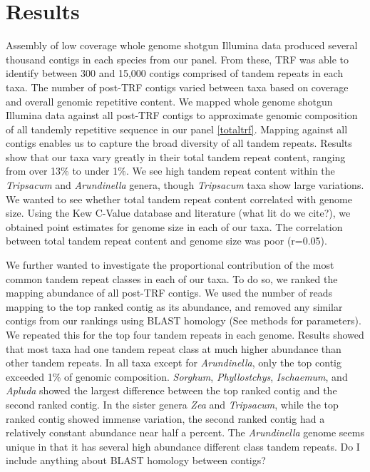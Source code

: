 \documentclass[10pt,letterpaper]{article}
\begin{document}
\section*{Results}
Assembly of low coverage whole genome shotgun Illumina data produced several thousand contigs in each species from our panel.
From these, TRF was able to identify between 300 and 15,000 contigs comprised of tandem repeats in each taxa.
The number of post-TRF contigs varied between taxa based on coverage and overall genomic repetitive content.
We mapped whole genome shotgun Illumina data against all post-TRF contigs to approximate genomic composition of all tandemly repetitive sequence in our panel \ref{totaltrf}.
Mapping against all contigs enables us to capture the broad diversity of all tandem repeats.
Results show that our taxa vary greatly in their total tandem repeat content, ranging from over 13\% to under 1\%.
We see high tandem repeat content within the \emph{Tripsacum} and \emph{Arundinella} genera, though \emph{Tripsacum} taxa show large variations.
We wanted to see whether total tandem repeat content correlated with genome size.
Using the Kew C-Value database and literature (what lit do we cite?), we obtained point estimates for genome size in each of our taxa.
The correlation between total tandem repeat content and genome size was poor (r=0.05).

We further wanted to investigate the proportional contribution of the most common tandem repeat classes in each of our taxa.
To do so, we ranked the mapping abundance of all post-TRF contigs.
We used the number of reads mapping to the top ranked contig as its abundance, and removed any similar contigs from our rankings using BLAST homology (See methods for parameters).
We repeated this for the top four tandem repeats in each genome.
Results showed that most taxa had one tandem repeat class at much higher abundance than other tandem repeats.
In all taxa except for \emph{Arundinella}, only the top contig exceeded 1\% of genomic composition.
\emph{Sorghum}, \emph{Phyllostchys}, \emph{Ischaemum}, and \emph{Apluda} showed the largest difference between the top ranked contig and the second ranked contig.
In the sister genera \emph{Zea} and \emph{Tripsacum}, while the top ranked contig showed immense variation, the second ranked contig had a relatively constant abundance near half a percent.
The \emph{Arundinella} genome seems unique in that it has several high abundance different class tandem repeats.
Do I include anything about BLAST homology between contigs?
\end{document}
